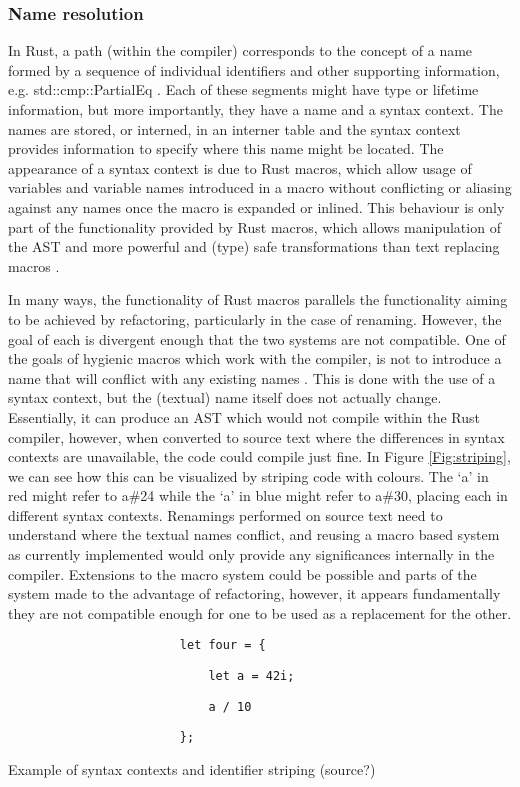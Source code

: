 \subsubsection{Name resolution}
In Rust, a path (within the compiler) corresponds to the concept of a name formed by a sequence of individual identifiers and other supporting information, e.g. std::cmp::PartialEq \cite{docpath15}. Each of these segments might have type or lifetime information, but more importantly, they have a name and a syntax context. The names are stored, or interned, in an interner table and the syntax context provides information to specify where this name might be located. The appearance of a syntax context is due to Rust macros, which allow usage of variables and variable names introduced in a macro without conflicting or aliasing against any names once the macro is expanded or inlined. This behaviour is only part of the functionality provided by Rust macros, which allows manipulation of the AST and more powerful and (type) safe transformations than text replacing macros \cite{keep15}.

In many ways, the functionality of Rust macros parallels the functionality aiming to be achieved by refactoring, particularly in the case of renaming. However, the goal of each is divergent enough that the two systems are not compatible. One of the goals of hygienic macros which work with the compiler, is not to introduce a name that will conflict with any existing names \cite{keep15}. This is done with the use of a syntax context, but the (textual) name itself does not actually change. Essentially, it can produce an AST which would not compile within the Rust compiler, however, when converted to source text where the differences in syntax contexts are unavailable, the code could compile just fine. In Figure \ref{Fig:striping}, we can see how this can be visualized by striping code with colours. The `a' in red might refer to a\#24 while the `a' in blue might refer to a\#30, placing each in different syntax contexts. Renamings performed on source text need to understand where the textual names conflict, and reusing a macro based system as currently implemented would only provide any significances internally in the compiler. Extensions to the macro system could be possible and parts of the system made to the advantage of refactoring, however, it appears fundamentally they are not compatible enough for one to be used as a replacement for the other.

\begin{fig}
{\color{blue}
\verb|                        let four = {|
}

{\color{red}

\verb|                            let a = 42i;|
}

{
\color{blue}

\verb|                            a / 10|
}

{\color{red}

\verb|                        };|
}

\caption{Example of syntax contexts and identifier striping (source?)}
\label{Fig:striping}
\end{fig}


